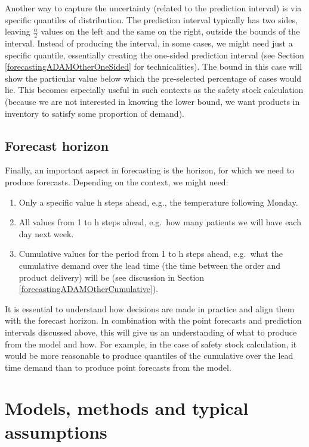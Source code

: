 \documentclass[
]{book}
\providecommand{\tightlist}{%
  \setlength{\itemsep}{0pt}\setlength{\parskip}{0pt}}
\theoremstyle{definition}
\theoremstyle{definition}
\theoremstyle{definition}
\theoremstyle{definition}
\theoremstyle{remark}
\begin{document}
Another way to capture the uncertainty (related to the prediction interval) is via specific quantiles of distribution. The prediction interval typically has two sides, leaving \(\frac{\alpha}{2}\) values on the left and the same on the right, outside the bounds of the interval. Instead of producing the interval, in some cases, we might need just a specific quantile, essentially creating the one-sided prediction interval (see Section \ref{forecastingADAMOtherOneSided} for technicalities). The bound in this case will show the particular value below which the pre-selected percentage of cases would lie. This becomes especially useful in such contexts as the safety stock calculation (because we are not interested in knowing the lower bound, we want products in inventory to satisfy some proportion of demand).

\hypertarget{forecast-horizon}{%
\subsection{Forecast horizon}\label{forecast-horizon}}

Finally, an important aspect in forecasting is the horizon, for which we need to produce forecasts. Depending on the context, we might need:

\begin{enumerate}
\def\labelenumi{\arabic{enumi}.}
\tightlist
\item
  Only a specific value h steps ahead, e.g., the temperature following Monday.
\item
  All values from 1 to h steps ahead, e.g.~how many patients we will have each day next week.
\item
  Cumulative values for the period from 1 to h steps ahead, e.g.~what the cumulative demand over the lead time (the time between the order and product delivery) will be (see discussion in Section \ref{forecastingADAMOtherCumulative}).
\end{enumerate}

It is essential to understand how decisions are made in practice and align them with the forecast horizon. In combination with the point forecasts and prediction intervals discussed above, this will give us an understanding of what to produce from the model and how. For example, in the case of safety stock calculation, it would be more reasonable to produce quantiles of the cumulative over the lead time demand than to produce point forecasts from the model.

\hypertarget{modelsMethods}{%
\section{Models, methods and typical assumptions}\label{modelsMethods}}
\end{document}
